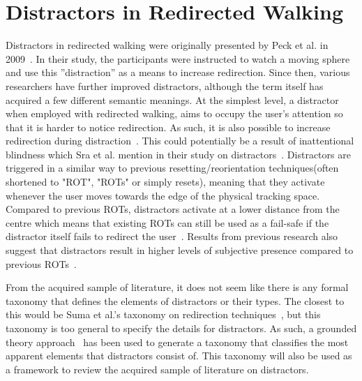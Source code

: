 \section{Distractors in Redirected Walking}\label{sec:relatedDistractors}
Distractors in redirected walking were originally presented by Peck et al. in 2009~\cite{peck2009evaluation}. In their study, the participants were instructed to watch a moving sphere and use this ''distraction'' as a means to increase redirection. Since then, various researchers have further improved distractors, although the term itself has acquired a few different semantic meanings. At the simplest level, a distractor when employed with redirected walking, aims to occupy the user's attention so that it is harder to notice redirection. As such, it is also possible to increase redirection during distraction~\cite{5072212}. This could potentially be a result of inattentional blindness which Sra et al. mention in their study on distractors~\cite{sra2018vmotion}. Distractors are triggered in a similar way to previous resetting/reorientation techniques(often shortened to "ROT", "ROTs" or simply resets), meaning that they activate whenever the user moves towards the edge of the physical tracking space. Compared to previous ROTs, distractors activate at a lower distance from the centre which means that existing ROTs can still be used as a fail-safe if the distractor itself fails to redirect the user~\cite{suma2012taxonomy}. Results from previous research also suggest that distractors result in higher levels of subjective presence compared to previous ROTs~\cite{peck2011evaluation}. 

From the acquired sample of literature, it does not seem like there is any formal taxonomy that defines the elements of distractors or their types. The closest to this would be Suma et al.'s taxonomy on redirection techniques~\cite{suma2012taxonomy}, but this taxonomy is too general to specify the details for distractors. As such, a grounded theory approach~\cite{strauss1994grounded} has been used to generate a taxonomy that classifies the most apparent elements that distractors consist of. This taxonomy will also be used as a framework to review the acquired sample of literature on distractors.

